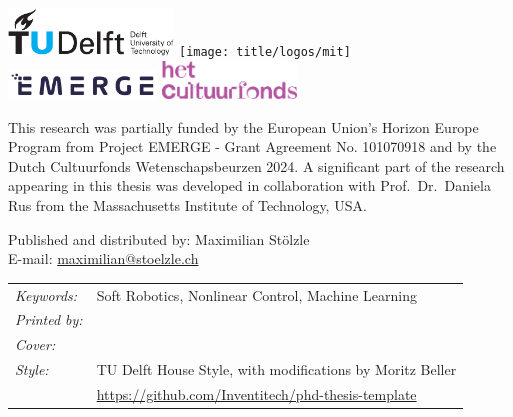 \begin{titlepage}
\begin{center}
    \includegraphics[height=0.5in]{title/logos/tudelft}
    \hspace{3em}
    \texttt{[image: title/logos/mit]}\\
    \vspace{0.5em}
    \includegraphics[height=0.3in]{title/logos/emerge}
    \hspace{3em}
    \includegraphics[height=0.4in]{title/logos/cultuurfonds}
\end{center}
\vfill

\noindent This research was partially funded by the European Union’s Horizon Europe Program from Project EMERGE - Grant Agreement No. 101070918 and by the Dutch Cultuurfonds Wetenschapsbeurzen 2024.
A significant part of the research appearing in this thesis was developed in collaboration with Prof.\ Dr.\ Daniela Rus from the Massachusetts Institute of Technology, USA.

\noindent Published and distributed by: Maximilian Stölzle\\
E-mail: \href{mailto:maximilian@stoelzle.ch}{maximilian@stoelzle.ch}\\

\noindent
\begin{tabular}{@{}p{}@{}p{}}
  \textit{Keywords:} & Soft Robotics, Nonlinear Control, Machine Learning  \\[\medskipamount]
      \textit{Printed by:} &  \\[\medskipamount]
      \textit{Cover:} &  \\[\medskipamount]
      \textit{Style:} & TU Delft House Style, with modifications by Moritz Beller \\& \url{https://github.com/Inventitech/phd-thesis-template} \\[\medskipamount]
\end{tabular}


\end{titlepage}
